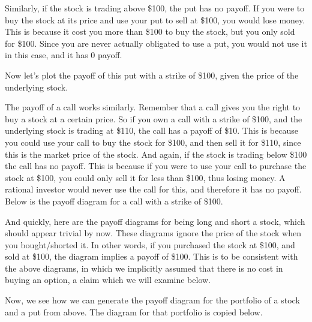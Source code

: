 \documentclass[letterpaper,10pt,english]{jupyterBook}
\begin{document}
\sphinxAtStartPar
Similarly, if the stock is trading above \$100, the put has no payoff. If you were to buy the stock at its price and use your put to sell at \$100, you would lose money. This is because it cost you more than \$100 to buy the stock, but you only sold for \$100. Since you are never actually obligated to use a put, you would not use it in this case, and it has 0 payoff.

\sphinxAtStartPar
{}

\sphinxAtStartPar
Now let’s plot the payoff of this put with a strike of \$100, given the price of the underlying stock.

\sphinxAtStartPar
{}

\sphinxAtStartPar
The payoff of a call works similarly. Remember that a call gives you the right to buy a stock at a certain price. So if you own a call with a strike of \$100, and the underlying stock is trading at \$110, the call has a payoff of \$10. This is because you could use your call to buy the stock for \$100, and then sell it for \$110, since this is the market price of the stock. And again, if the stock is trading below \$100 the call has no payoff. This is because if you were to use your call to purchase the stock at \$100, you could only sell it for less than \$100, thus losing money. A rational investor would never use the call for this, and therefore it has no payoff. Below is the payoff diagram for a call with a strike of \$100.

\sphinxAtStartPar
{}

\sphinxAtStartPar
And quickly, here are the payoff diagrams for being long and short a stock, which should appear trivial by now. These diagrams ignore the price of the stock when you bought/shorted it. In other words, if you purchased the stock at \$100, and sold at \$100, the diagram implies a payoff of \$100. This is to be consistent with the above diagrams, in which we implicitly assumed that there is no cost in buying an option, a claim which we will examine below.

\sphinxAtStartPar
{}

\sphinxAtStartPar
{}

\sphinxAtStartPar
Now, we see how we can generate the payoff diagram for the portfolio of a stock and a put from above. The diagram for that portfolio is copied below.
\end{document}
